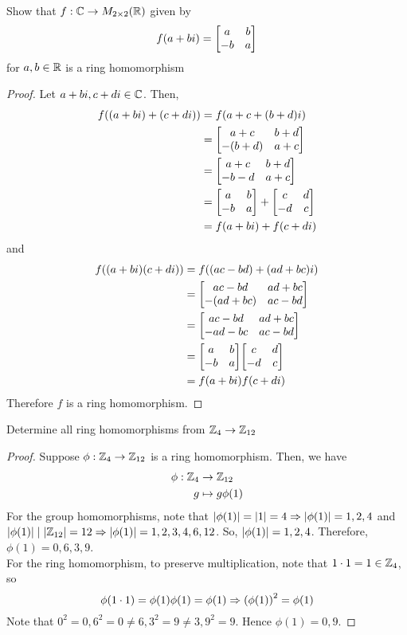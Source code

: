 \begin{exercise}
    Show that $f: \mathbb{C} \to M_{2 \times 2} (\mathbb{R})$ given by 
    \[ f(a + bi) = \mqty[a & b \\ -b & a] \]
    for $a, b \in \mathbb{R}$ is a ring homomorphism
\end{exercise}

\begin{proof}
 Let $a + bi, c + di \in \mathbb{C}$. Then,
    \begin{align*}
        f((a + bi) + (c + di)) &= f(a + c + (b + d)i) \\
        &= \mqty[a + c & b + d \\ - (b + d) & a + c]  \\
        &= \mqty[a + c & b + d \\ - b - d & a + c]  \\
        &= \mqty[a & b \\ - b & a]  + \mqty[c & d \\ - d & c] \\
        &= f(a + bi) + f(c + di)
    \end{align*}
    and 
    \begin{align*}
        f((a + bi)(c + di)) &= f((ac - bd) + (ad + bc)i) \\
        &= \mqty[ac - bd & ad + bc \\ - (ad + bc) & ac - bd] \\
        &= \mqty[ac - bd & ad + bc \\ - ad - bc & ac - bd] \\
        &= \mqty[a & b \\ -b & a]\mqty[c & d \\ -d & c] \\
        &= f(a + bi) f(c + di)
    \end{align*}
    Therefore $f$ is a ring homomorphism. \qedsymbol
\end{proof}

\begin{exercise}
    Determine all ring homomorphisms from $\mathbb{Z}_4 \to \mathbb{Z}_{12}$
\end{exercise}

\begin{proof}
    Suppose $\phi: \mathbb{Z}_4 \to \mathbb{Z}_{12}$ is a ring homomorphism. Then, we have
    \begin{align*}
        \phi :  \mathbb{Z}_4 &\to \mathbb{Z}_{12} \\
        g &\mapsto  g \phi(1)
    \end{align*}
    For the group homomorphisms, note that $\qty|\phi(1)| = \qty|1| = 4 \Rightarrow \qty|\phi(1)| = 1, 2, 4$ and $\qty|\phi(1)| \mid \qty|\mathbb{Z}_{12}| = 12 \Rightarrow \qty|\phi(1)| = 1, 2, 3, 4, 6, 12$. So, $\qty|\phi(1)| = 1, 2, 4$. Therefore, $\phi(1) = 0, 6, 3, 9$. \\
    
    For the ring homomorphism, to preserve multiplication, note that $1 \cdot 1 = 1 \in \mathbb{Z}_4$, so 
    \[ \phi(1 \cdot 1) = \phi(1) \phi(1) = \phi(1) \Rightarrow \qty(\phi(1))^2 = \phi(1) \]
    Note that $0^2 = 0, 6^2 = 0 \neq 6, 3^2 = 9 \neq 3, 9^2 = 9$. Hence $\phi(1) = 0, 9$. \qedsymbol
\end{proof}

